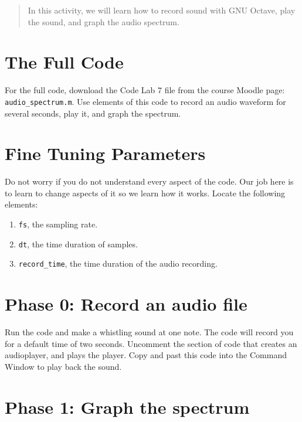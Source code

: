 \documentclass[10.5pt]{article}
\begin{document}
\twocolumn
\maketitle

\begin{abstract}
In this activity, we will learn how to record sound with GNU Octave, play the sound, and graph the audio spectrum.
\end{abstract}

\section{The Full Code}

For the full code, download the Code Lab 7 file from the course Moodle page: \verb+audio_spectrum.m+.  Use elements of this code to record an audio waveform for several seconds, play it, and graph the spectrum.

\section{Fine Tuning Parameters}

Do not worry if you do not understand every aspect of the code.  Our job here is to learn to change aspects of it so we learn how it works.  Locate the following elements:

\begin{enumerate}
\item \verb+fs+, the sampling rate.
\item \verb+dt+, the time duration of samples.
\item \verb+record_time+, the time duration of the audio recording.
\end{enumerate}

\section{Phase 0: Record an audio file}

Run the code and make a whistling sound at one note.  The code will record you for a default time of two seconds.  Uncomment the section of code that creates an audioplayer, and plays the player.  Copy and past this code into the Command Window to play back the sound.

\section{Phase 1: Graph the spectrum}
\end{document}
